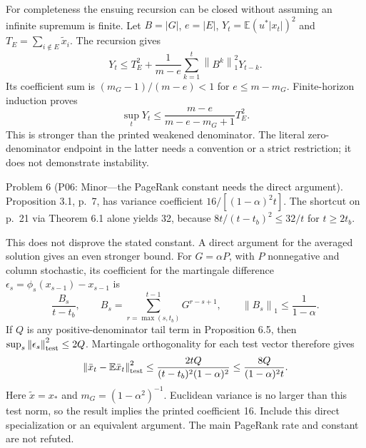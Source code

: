 \documentclass[10pt]{article}
\begin{document}
For completeness the ensuing recursion can be closed without assuming an infinite supremum is finite. Let \(B=|G|\), \(e=|E|\), \(Y_t=\mathbb E(u^*|x_t|)^2\) and \(T_E=\sum_{i\notin E}\widetilde x_i\). The recursion gives \[Y_t\le T_E^2+\frac1{m-e}\sum_{k=1}^t\left\lVert B^k\right\rVert_1^2Y_{t-k}.\] Its coefficient sum is \((m_G-1)/(m-e)<1\) for \(e\le m-m_G\). Finite-horizon induction proves \[\sup_tY_t\le\frac{m-e}{m-e-m_G+1}T_E^2.\] This is stronger than the printed weakened denominator. The literal zero-denominator endpoint in the latter needs a convention or a strict restriction; it does not demonstrate instability.\par
Problem 6 (P06: Minor—the PageRank constant needs the direct argument).  Proposition 3.1, p. 7, has variance coefficient \(16/[(1-\alpha)^2t]\). The shortcut on p. 21 via Theorem 6.1 alone yields 32, because \(8t/(t-t_b)^2\le32/t\) for \(t\ge2t_b\).\par
This does not disprove the stated constant. A direct argument for the averaged solution gives an even stronger bound. For \(G=\alpha P\), with \(P\) nonnegative and column stochastic, its coefficient for the martingale difference \(\epsilon_s=\phi_s(x_{s-1})-x_{s-1}\) is \[\frac{B_s}{t-t_b},\qquad
 B_s=\sum_{r=\max(s,t_b)}^{t-1}G^{r-s+1},\qquad
 \left\lVert B_s\right\rVert_1\le\frac1{1-\alpha}.\] If \(Q\) is any positive-denominator tail term in Proposition 6.5, then \(\sup_s\left\lVert\epsilon_s\right\rVert_{\rm test}^2\le2Q\). Martingale orthogonality for each test vector therefore gives \[\left\lVert\bar x_t-\mathbb E\bar x_t\right\rVert_{\rm test}^2
 \le\frac{2tQ}{(t-t_b)^2(1-\alpha)^2}
 \le\frac{8Q}{(1-\alpha)^2t}.\] Here \(\widetilde x=x_*\) and \(m_G=(1-\alpha^2)^{-1}\). Euclidean variance is no larger than this test norm, so the result implies the printed coefficient 16. Include this direct specialization or an equivalent argument. The main PageRank rate and constant are not refuted.\par
\end{document}
